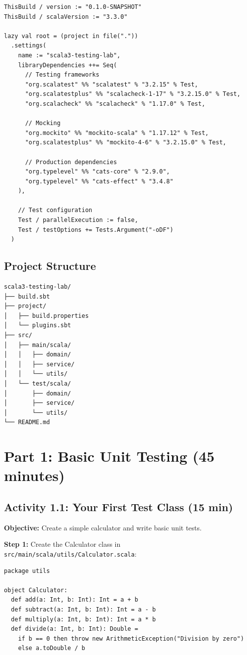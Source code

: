 \documentclass[12pt,a4paper]{article}
\begin{document}
\begin{lstlisting}
ThisBuild / version := "0.1.0-SNAPSHOT"
ThisBuild / scalaVersion := "3.3.0"

lazy val root = (project in file("."))
  .settings(
    name := "scala3-testing-lab",
    libraryDependencies ++= Seq(
      // Testing frameworks
      "org.scalatest" %% "scalatest" % "3.2.15" % Test,
      "org.scalatestplus" %% "scalacheck-1-17" % "3.2.15.0" % Test,
      "org.scalacheck" %% "scalacheck" % "1.17.0" % Test,
      
      // Mocking
      "org.mockito" %% "mockito-scala" % "1.17.12" % Test,
      "org.scalatestplus" %% "mockito-4-6" % "3.2.15.0" % Test,
      
      // Production dependencies
      "org.typelevel" %% "cats-core" % "2.9.0",
      "org.typelevel" %% "cats-effect" % "3.4.8"
    ),
    
    // Test configuration
    Test / parallelExecution := false,
    Test / testOptions += Tests.Argument("-oDF")
  )
\end{lstlisting}

\subsection{Project Structure}
\begin{lstlisting}
scala3-testing-lab/
├── build.sbt
├── project/
│   ├── build.properties
│   └── plugins.sbt
├── src/
│   ├── main/scala/
│   │   ├── domain/
│   │   ├── service/
│   │   └── utils/
│   └── test/scala/
│       ├── domain/
│       ├── service/
│       └── utils/
└── README.md
\end{lstlisting}

\section{Part 1: Basic Unit Testing (45 minutes)}

\subsection{Activity 1.1: Your First Test Class (15 min)}

\textbf{Objective:} Create a simple calculator and write basic unit tests.

\textbf{Step 1:} Create the Calculator class in \texttt{src/main/scala/utils/Calculator.scala}:

\begin{lstlisting}
package utils

object Calculator:
  def add(a: Int, b: Int): Int = a + b
  def subtract(a: Int, b: Int): Int = a - b
  def multiply(a: Int, b: Int): Int = a * b
  def divide(a: Int, b: Int): Double = 
    if b == 0 then throw new ArithmeticException("Division by zero")
    else a.toDouble / b
\end{lstlisting}
\end{document}
